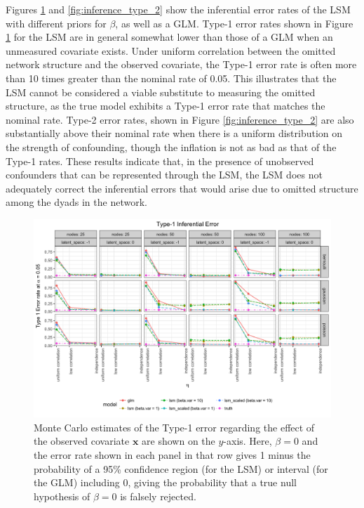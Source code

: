 \documentclass[11pt]{article}
\begin{document}
Figures \ref{fig:inference_type_1} and \ref{fig:inference_type_2} show the inferential error rates of the LSM with different priors for $\beta$, as well as a GLM. Type-1 error rates shown in Figure \ref{fig:inference_type_1} for the LSM are in general somewhat lower than those of a GLM when an unmeasured covariate exists. Under uniform correlation between the omitted network structure and the observed covariate, the Type-1 error rate is often more than 10 times greater than the nominal rate of 0.05. This illustrates that the LSM cannot be considered a viable substitute to measuring the omitted structure, as the true model exhibits a Type-1 error rate that matches the nominal rate. Type-2 error rates, shown in Figure \ref{fig:inference_type_2} are also substantially above their nominal rate when there is a uniform distribution on the strength of confounding, though the inflation is not as bad as that of the Type-1 rates. These results indicate that, in the presence of unobserved confounders that can be represented through the LSM, the LSM does not adequately correct the inferential errors that would arise due to omitted structure among the dyads in the network.

\begin{figure}
\includegraphics[width=\textwidth]{figures/inference_type_1.png}
\caption{Monte Carlo estimates of the Type-1 error regarding the effect of the observed covariate $\mathbf{x}$ are shown on the $y$-axis. Here, $\beta = 0$ and the error rate shown in each panel in that row gives 1 minus the probability of a 95\% confidence region (for the LSM) or interval (for the GLM) including $0$, giving the probability that a true null hypothesis of $\beta = 0$ is falsely rejected. \label{fig:inference_type_1}}
\end{figure}
\end{document}
